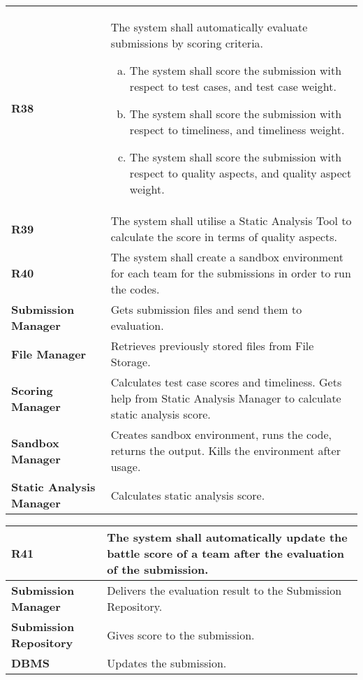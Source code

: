 \begin{table}[h!]
  \centering
  \begin{tabular}{lp{12cm}}
    \hline
    \textbf{R38} & The system shall automatically evaluate submissions by scoring criteria.
     \begin{enumerate}[(a)]
         \item The system shall score the submission with respect to test cases, and test case weight.
         \item The system shall score the submission with respect to timeliness, and timeliness weight.
         \item The system shall score the submission with respect to quality aspects, and quality aspect weight.
     \end{enumerate}
\\
 \textbf{R39} & The system shall utilise a Static Analysis Tool to calculate the score in terms of quality aspects.\\
 \textbf{R40} & The system shall create a sandbox environment for each team for the submissions in order to run the codes.\\
    \hline
    \hline
    \textbf{Submission Manager} & Gets submission files and send them to evaluation. \\
    \textbf{File Manager} & Retrieves previously stored files from File Storage.\\
    \textbf{Scoring Manager} &  Calculates test case scores and timeliness. Gets help from Static Analysis Manager to calculate static analysis score.\\
    \textbf{Sandbox Manager} & Creates sandbox environment, runs the code, returns the output. Kills the environment after usage.\\
    \textbf{Static Analysis Manager} & Calculates static analysis score. \\
    \hline
  \end{tabular}
\end{table}

\begin{table}[h!]
  \centering
  \begin{tabular}{lp{12cm}}
    \hline
    \textbf{R41} &  The system shall automatically update the battle score of a team after the evaluation of the submission. \\
    \hline
    \hline
    \textbf{Submission Manager} & Delivers the evaluation result to the Submission Repository. \\
    \textbf{Submission Repository} & Gives score to the submission.\\
    \textbf{DBMS} & Updates the submission.\\
    \hline
  \end{tabular}
\end{table}



